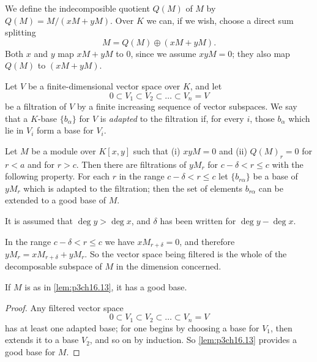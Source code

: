 \documentclass[../main]{subfiles}
\begin{document}
We define the indecomposible quotient $Q(M)$ of $M$ by $Q(M) = M/(x M +y M)$. Over $K$ we can, if we wish, choose a direct sum splitting \[M = Q(M) \oplus (x M + y M).\] Both $x$ and $y$ map $x M + y M$ to $0$, since we assume $x y M = 0$; they also map $Q(M)$ to $(x M + y M)$.

Let $V$ be a finite-dimensional vector space over $K$, and let \[0 \subset V_1 \subset V_2 \subset \ldots \subset V_n = V\] be a filtration of $V$ by a finite increasing sequence of vector subspaces. We say that a $K$-base $\{b_\alpha\}$ for $V$ is \emph{adapted} to the filtration if, for every $i$, those $b_\alpha$ which lie in $V_i$ form a base for $V_i$.

\begin{lemma}
\label{lem:p3ch16.13}
Let $M$ be a module over $K[x, y]$ such that (i) $xy M = 0$ and (ii) $Q(M)_r = 0$ for $r < a$ and for $r > c$. Then there are filtrations of $y M_r$ for $c - \delta < r \le c$ with the following property. For each $r$ in the range $c - \delta < r \le c$ let $\{b_{r \alpha}\}$ be a base of $y M_r$ which is adapted to the filtration; then the set of elements $b_{r \alpha}$ can be extended to a good base of $M$. 
\end{lemma}

\begin{notes}
It is assumed that $\deg y > \deg x$, and $\delta$ has been written for $\deg y - \deg x$.
\end{notes}

\begin{notes}
In the range $c - \delta < r \le c$ we have $x M_{r + \delta} = 0$, and therefore $y M_r = x M_{r + \delta} + y M_r$. So the vector space being filtered is the whole of the decomposable subspace of $M$ in the dimension concerned.
\end{notes}

\begin{corollary}
\label{cor:p3ch16.14}
If $M$ is as in \ref{lem:p3ch16.13}, it has a good base. 
\end{corollary}

\begin{proof}
Any filtered vector space \[0 \subset V_1 \subset V_2 \subset \ldots \subset V_n = V\] has at least one adapted base; for one begins by choosing a base for $V_1$, then extends it to a base $V_2$, and so on by induction. So \ref{lem:p3ch16.13} provides a good base for $M$.
\end{proof}
\end{document}
